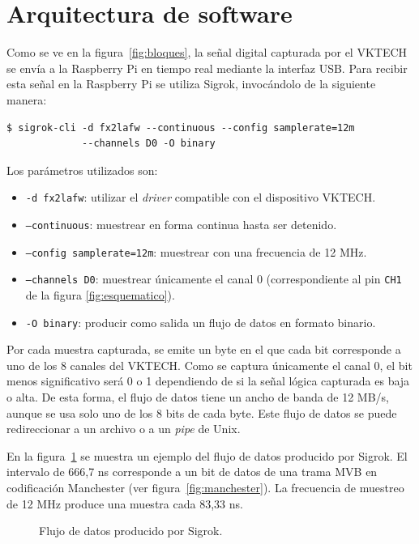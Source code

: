 \section{Arquitectura de software}
\label{sec:software}

Como se ve en la figura~\ref{fig:bloques}, la señal digital capturada por el VKTECH se envía a la Raspberry Pi en tiempo real mediante la interfaz USB. Para recibir esta señal en la Raspberry Pi se utiliza Sigrok, invocándolo de la siguiente manera:

\begin{lstlisting}[basicstyle=\small,breaklines=true]
$ sigrok-cli -d fx2lafw --continuous --config samplerate=12m
             --channels D0 -O binary
\end{lstlisting}

Los parámetros utilizados son:

\begin{itemize}
    \item \texttt{-d fx2lafw}: utilizar el \textit{driver} compatible con el dispositivo VKTECH.
    \item \texttt{--continuous}: muestrear en forma continua hasta ser detenido.
    \item \texttt{--config samplerate=12m}: muestrear con una frecuencia de 12 MHz.
    \item \texttt{--channels D0}: muestrear únicamente el canal 0 (correspondiente al pin \texttt{CH1} de la figura \ref{fig:esquematico}).
    \item \texttt{-O binary}: producir como salida un flujo de datos en formato binario.
\end{itemize}

Por cada muestra capturada, se emite un byte en el que cada bit corresponde a uno de los 8 canales del VKTECH.
Como se captura únicamente el canal 0, el bit menos significativo será 0 o 1 dependiendo de si la señal lógica capturada es baja o alta.
De esta forma, el flujo de datos tiene un ancho de banda de 12 MB/s, aunque se usa solo uno de los 8 bits de cada byte.
Este flujo de datos se puede redireccionar a un archivo o a un \textit{pipe} de Unix.

En la figura~\ref{fig:sigrok} se muestra un ejemplo del flujo de datos producido por Sigrok. El intervalo de 666,7 ns corresponde a un bit de datos de una trama MVB en codificación Manchester (ver figura~\ref{fig:manchester}). La frecuencia de muestreo de 12 MHz produce una muestra cada 83,33 ns.

\begin{figure}[htbp]
	\centering
    {
        \fontsize{9pt}{9pt}\selectfont
        
    }
	\caption{Flujo de datos producido por Sigrok.}
    \label{fig:sigrok}
\end{figure}

